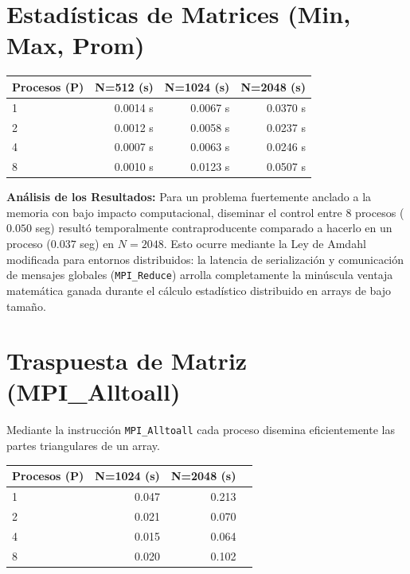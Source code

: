 \documentclass[11pt,a4paper]{article}
\begin{document}
\newpage

\section{Estadísticas de Matrices (Min, Max, Prom)}

\begin{center}
\begin{tabular}{|l|r|r|r|}
\hline
\textbf{Procesos (P)} & \textbf{N=512 (s)} & \textbf{N=1024 (s)} & \textbf{N=2048 (s)}\\
\hline
1 & 0.0014 s & 0.0067 s & 0.0370 s \\
2 & 0.0012 s & 0.0058 s & 0.0237 s \\
4 & 0.0007 s & 0.0063 s & 0.0246 s \\
8 & 0.0010 s & 0.0123 s & 0.0507 s \\
\hline
\end{tabular}
\end{center}

\textbf{Análisis de los Resultados:} Para un problema fuertemente anclado a la memoria con bajo impacto computacional, diseminar el control entre 8 procesos ($0.050$ seg) resultó temporalmente contraproducente comparado a hacerlo en un proceso ($0.037$ seg) en $N=2048$. 
Esto ocurre mediante la Ley de Amdahl modificada para entornos distribuidos: la latencia de serialización y comunicación de mensajes globales (\texttt{MPI\_Reduce}) arrolla completamente la minúscula ventaja matemática ganada durante el cálculo estadístico distribuido en arrays de bajo tamaño.

\section{Traspuesta de Matriz (MPI\_Alltoall)}

Mediante la instrucción \texttt{MPI\_Alltoall} cada proceso disemina eficientemente las partes triangulares de un array.

\begin{center}
\begin{tabular}{|l|r|r|r|}
\hline
\textbf{Procesos (P)} & \textbf{N=1024 (s)} & \textbf{N=2048 (s)} \\
\hline
1 & 0.047 & 0.213  \\
2 & 0.021 & 0.070  \\
4 & 0.015 & 0.064  \\
8 & 0.020 & 0.102  \\
\hline
\end{tabular}
\end{center}
\end{document}
